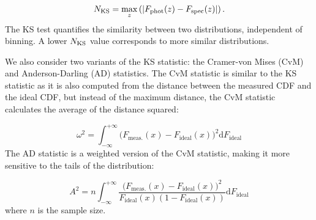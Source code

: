 \documentclass[usenatbib]{mn2e}
\begin{document}
\begin{equation}
N_{\rm KS} = \max_{z}\left( \left| F_{\rm phot}(z) - F_{\rm spec}(z) \right| \right).
\end{equation}
The KS test quantifies the similarity between two distributions, independent of binning. 
A lower $N_{\rm KS}$ value corresponds to more similar distributions.

We also consider two variants of the KS statistic: the Cramer-von Mises (CvM) and Anderson-Darling (AD) statistics.
The CvM statistic is similar to the KS statistic as it is also computed from the distance between the measured CDF and the ideal CDF, but instead of the maximum distance, the CvM statistic calculates the average of the distance squared: 

\begin{equation}
\label{eq:cvm}
\omega^2 = \int_{-\infty}^{+\infty}\big(F_{\mathrm{meas.}}(x) - F_{\mathrm{ideal}}(x)\big)^2\mathrm{d}F_{\mathrm{ideal}}
\end{equation}
The AD statistic is a weighted version of the CvM statistic, making it more sensitive to the tails of the distribution: 

\begin{equation} \label{eq:ad}
A^2 = n\int_{-\infty}^{+\infty} \frac{\big(F_{\mathrm{meas.}}(x) - F_{\mathrm{ideal}}(x)\big)^2} {F_{\mathrm{ideal}}(x) (1-F_{\mathrm{ideal}}(x))}\mathrm{d}F_{\mathrm{ideal}}
\end{equation}
where $n$ is the sample size. 
\end{document}
